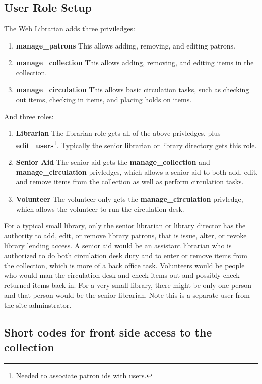 \documentclass[letterpaper,twoside]{article}
\begin{document}
\subsection{User Role Setup}

The Web Librarian adds three priviledges:

\begin{enumerate}
\item \textbf{manage\_patrons} This allows adding, removing, and editing
patrons.
\item \textbf{manage\_collection} This allows adding, removing, and
editing items in the collection.
\item \textbf{manage\_circulation} This allows basic circulation tasks,
such as checking out items, checking in items, and placing holds on items.
\end{enumerate}

And three roles:
\begin{enumerate}
\item \textbf{Librarian} The librarian role gets all of the above
privledges, plus \textbf{edit\_users}\footnote{Needed to associate
patron ids with users.}. Typically the senior librarian or library
directory gets this role.
\item \textbf{Senior Aid} The senior aid gets the
\textbf{manage\_collection} and \textbf{manage\_circulation} privledges,
which allows a senior aid to both add, edit, and remove items from the
collection as well as perform circulation tasks.
\item \textbf{Volunteer} The volunteer only gets the
\textbf{manage\_circulation} privledge, which allows the volunteer to
run the circulation desk.
\end{enumerate}

For a typical small library, only the senior librarian or library
director has the authority to add, edit, or remove library
patrons, that is issue, alter, or revoke library lending access. A
senior aid would be an assistant librarian who is authorized to do both
circulation desk duty and to enter or remove items from the collection,
which is more of a back office task.  Volunteers would be people who
would man the circulation desk and check items out and possibly check returned
items back in.  For a very small library, there might be only one person
and that person would be the senior librarian.  Note this is a separate
user from the site adminstrator.

\subsection{Short codes for front side access to the collection}
\end{document}
